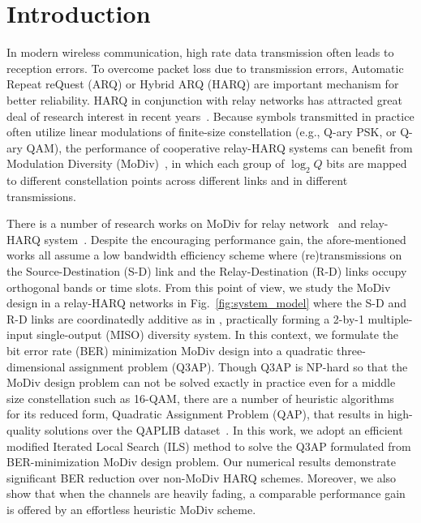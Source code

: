 \documentclass[journal]{IEEEtran}
\begin{document}
\section{Introduction}
In modern wireless communication, high rate data transmission often leads
to reception errors. To overcome packet loss due to transmission errors, 
Automatic Repeat reQuest (ARQ) or Hybrid ARQ (HARQ) are important mechanism for
better reliability. HARQ in conjunction with relay networks has attracted great
deal of research interest in recent years~\cite{ngo2014hybrid}. Because symbols
transmitted in practice often utilize linear modulations of finite-size
constellation (e.g., Q-ary PSK, or Q-ary QAM), the performance of cooperative
relay-HARQ systems can benefit from Modulation Diversity 
(MoDiv)~\cite{benelli1992new}, in which each
group of $\log_2 Q$ bits are mapped to different constellation points across
different links and in different transmissions. 

There is a number of research works on MoDiv for relay
network~\cite{seddik2008trans, khormuji2008rate} and relay-HARQ
system~\cite{kim2009design, ryu2011ber}. Despite the encouraging
performance gain, the afore-mentioned works all assume a low bandwidth
efficiency scheme where (re)transmissions on the Source-Destination (S-D) link
and the Relay-Destination (R-D) links occupy orthogonal bands or time slots.
From this point of view, we study the MoDiv design in a relay-HARQ networks in
Fig.~\ref{fig:system_model} where the S-D and R-D links are coordinatedly additive as in
\cite{cover1979capacity, nabar2004fading}, practically
forming a 2-by-1 multiple-input single-output (MISO) diversity system. In this
context, we formulate the bit error rate (BER) minimization MoDiv design into a
quadratic three-dimensional assignment problem (Q3AP). Though Q3AP is NP-hard so
that the MoDiv design problem can not be solved exactly in practice even for a
middle size constellation such as 16-QAM, there are a number of heuristic
algorithms~\cite{benlic2015memetic}
for its reduced form, Quadratic Assignment Problem (QAP), that results in
high-quality solutions over the QAPLIB dataset~\cite{burkard1997qaplib}. In this
work, we adopt an efficient modified Iterated Local Search (ILS) method to solve
the Q3AP formulated from BER-minimization MoDiv design problem. Our numerical
results demonstrate significant BER reduction over non-MoDiv HARQ schemes.
Moreover, we also show that when the channels are heavily fading, a comparable
performance gain is offered by an effortless heuristic MoDiv scheme.
\end{document}
